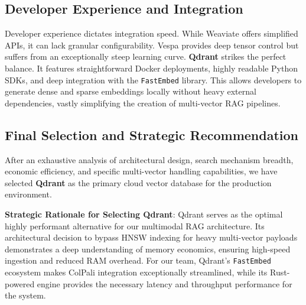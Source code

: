\subsection{Developer Experience and Integration}
Developer experience dictates integration speed. While Weaviate offers simplified APIs, it can lack granular configurability. Vespa provides deep tensor control but suffers from an exceptionally steep learning curve. \textbf{Qdrant} strikes the perfect balance. It features straightforward Docker deployments, highly readable Python SDKs, and deep integration with the \texttt{FastEmbed} library. This allows developers to generate dense and sparse embeddings locally without heavy external dependencies, vastly simplifying the creation of multi-vector RAG pipelines.

\subsection{Final Selection and Strategic Recommendation}

\begin{table}[H]
    \centering
    \caption{Holistic Vector Database Comparison Summary}
    \label{tab:holistic_db_comp}
\end{table}

After an exhaustive analysis of architectural design, search mechanism breadth, economic efficiency, and specific multi-vector handling capabilities, we have selected \textbf{Qdrant} as the primary cloud vector database for the production environment. 

\textbf{Strategic Rationale for Selecting Qdrant}:
Qdrant serves as the optimal highly performant alternative for our multimodal RAG architecture. Its architectural decision to bypass HNSW indexing for heavy multi-vector payloads demonstrates a deep understanding of memory economics, ensuring high-speed ingestion and reduced RAM overhead. For our team, Qdrant's \texttt{FastEmbed} ecosystem makes ColPali integration exceptionally streamlined, while its Rust-powered engine provides the necessary latency and throughput performance for the system.

\newpage